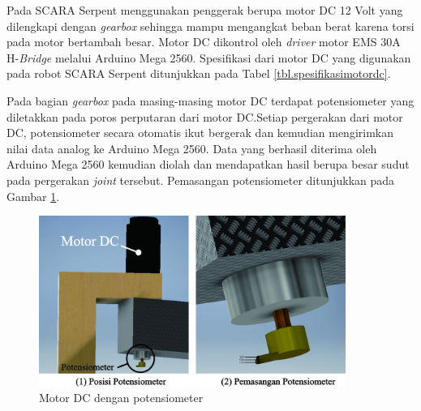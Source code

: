 Pada  SCARA Serpent menggunakan penggerak berupa motor DC 12 Volt yang dilengkapi dengan \textit{gearbox} sehingga mampu mengangkat beban berat karena torsi pada motor bertambah besar. Motor DC dikontrol oleh \textit{driver} motor EMS 30A H-\textit{Bridge} melalui Arduino Mega 2560. Spesifikasi dari motor DC yang digunakan pada robot SCARA Serpent ditunjukkan pada Tabel \ref{tbl.spesifikasimotordc}.
\begin{table}[H]
	\centering
	\caption{Spesifikasi Motor DC pada Robot SCARA Serpent}
	\label{tbl.spesifikasimotordc}
\end{table}
Pada bagian \textit{gearbox} pada masing-masing motor DC terdapat potensiometer yang diletakkan pada poros perputaran dari motor DC.Setiap pergerakan dari motor DC, potensiometer secara otomatis ikut bergerak dan kemudian mengirimkan nilai data analog ke Arduino Mega 2560. Data yang berhasil diterima oleh Arduino Mega 2560 kemudian diolah dan mendapatkan hasil berupa besar sudut pada pergerakan \textit{joint} tersebut. Pemasangan potensiometer ditunjukkan pada Gambar \ref{pic.potensiometer}.
\begin{figure}[H]
	\centering
	\includegraphics[width=10cm]{gambar/potsementara.jpg}
	\caption{Motor DC dengan potensiometer}
	\label{pic.potensiometer}
\end{figure}

